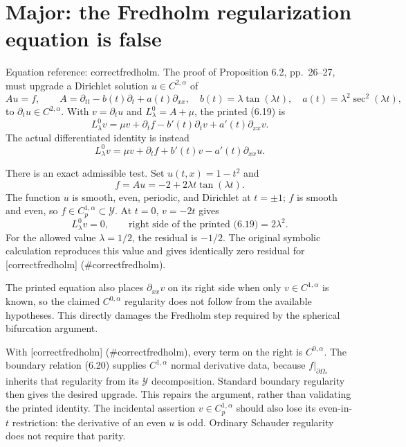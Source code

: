 \documentclass[10pt]{article}
\begin{document}
\section*{Major: the Fredholm regularization equation is false}
Equation reference: correctfredholm. The proof of Proposition 6.2, pp. 26–27, must upgrade a Dirichlet solution \(u\in C^{2,\alpha}\) of \[Au=f,\qquad
A=\partial_{tt}-b(t)\partial_t+a(t)\partial_{xx},\quad
b(t)=\lambda\tan(\lambda t),\quad
a(t)=\lambda^2\sec^2(\lambda t),\] to \(\partial_tu\in C^{2,\alpha}\). With \(v=\partial_tu\) and \(L_\lambda^0=A+\mu\), the printed (6.19) is \[L_\lambda^0v=\mu v+\partial_tf-b'(t)\partial_tv+a'(t)\partial_{xx}v.\] The actual differentiated identity is instead \[
L_\lambda^0v=\mu v+\partial_tf+b'(t)v-a'(t)\partial_{xx}u.\]\par
There is an exact admissible test. Set \(u(t,x)=1-t^2\) and \[f=Au=-2+2\lambda t\tan(\lambda t).\] The function \(u\) is smooth, even, periodic, and Dirichlet at \(t=\pm1\); \(f\) is smooth and even, so \(f\in C_p^{1,\alpha}\subset\mathcal Y\). At \(t=0\), \(v=-2t\) gives \[L_\lambda^0v=0,\qquad
\text{right side of the printed (6.19)}=2\lambda^2.\] For the allowed value \(\lambda=1/2\), the residual is \(-1/2\). The original symbolic calculation reproduces this value and gives identically zero residual for [correctfredholm] (\#correctfredholm).\par
The printed equation also places \(\partial_{xx}v\) on its right side when only \(v\in C^{1,\alpha}\) is known, so the claimed \(C^{0,\alpha}\) regularity does not follow from the available hypotheses. This directly damages the Fredholm step required by the spherical bifurcation argument.\par
With [correctfredholm] (\#correctfredholm), every term on the right is \(C^{0,\alpha}\). The boundary relation (6.20) supplies \(C^{1,\alpha}\) normal derivative data, because \(f|_{\partial\Omega_*}\) inherits that regularity from its \(\mathcal Y\) decomposition. Standard boundary regularity then gives the desired upgrade. This repairs the argument, rather than validating the printed identity. The incidental assertion \(v\in C_p^{1,\alpha}\) should also lose its even-in-\(t\) restriction: the derivative of an even \(u\) is odd. Ordinary Schauder regularity does not require that parity.\par
\end{document}
